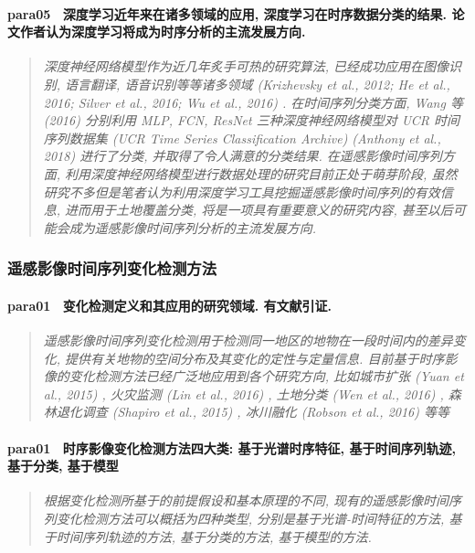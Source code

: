 \paragraph*{para05~
    \textcolor[RGB]{17, 205, 29}{深度学习近年来在诸多领域的应用, 深度学习在时序数据分类的结果. 论文作者认为深度学习将成为时序分析的主流发展方向.}}
\begin{quotation}
    \itshape
    深度神经网络模型作为近几年炙手可热的研究算法, 已经成功应用在图像识别, 语言翻译, 语音识别等等诸多领域 (Krizhevsky et al.,   2012; He et al., 2016; Silver et al., 2016; Wu et al., 2016) . 在时间序列分类方面, Wang 等 (2016) 分别利用 MLP, FCN, ResNet 三种深度神经网络模型对 UCR 时间序列数据集 (UCR Time Series Classification Archive)  (Anthony et  al., 2018) 进行了分类, 并取得了令人满意的分类结果. 在遥感影像时间序列方面, 利用深度神经网络模型进行数据处理的研究目前正处于萌芽阶段, 虽然研究不多但是笔者认为利用深度学习工具挖掘遥感影像时间序列的有效信息, 进而用于土地覆盖分类, 将是一项具有重要意义的研究内容, 甚至以后可能会成为遥感影像时间序列分析的主流发展方向.  
\end{quotation}

\subsubsection{遥感影像时间序列变化检测方法}
\paragraph*{para01~
    \textcolor[RGB]{17, 205, 29}{变化检测定义和其应用的研究领域. 有文献引证.}}
\begin{quotation}
    \itshape
    遥感影像时间序列变化检测用于检测同一地区的地物在一段时间内的差异变化, 提供有关地物的空间分布及其变化的定性与定量信息. 目前基于时序影像的变化检测方法已经广泛地应用到各个研究方向, 比如城市扩张 (Yuan  et  al., 2015) , 火灾监测 (Lin et al., 2016) , 土地分类 (Wen et al., 2016) , 森林退化调查 (Shapiro et al., 2015) , 冰川融化 (Robson et al., 2016) 等等
\end{quotation}

\paragraph*{para01~
    \textcolor[RGB]{17, 205, 29}{时序影像变化检测方法四大类: 基于光谱时序特征, 基于时间序列轨迹, 基于分类, 基于模型}}
\begin{quotation}
    \itshape
    根据变化检测所基于的前提假设和基本原理的不同, 现有的遥感影像时间序列变化检测方法可以概括为四种类型, 分别是基于光谱-时间特征的方法, 基于时间序列轨迹的方法, 基于分类的方法, 基于模型的方法.
\end{quotation}

